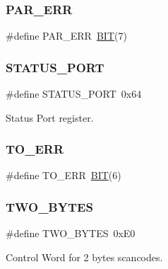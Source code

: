 \subsubsection{\texorpdfstring{P\+A\+R\+\_\+\+E\+RR}{PAR\_ERR}}
{\footnotesize\ttfamily \#define P\+A\+R\+\_\+\+E\+RR~\hyperlink{tools_8h_a3a8ea58898cb58fc96013383d39f482c}{B\+IT}(7)}

\hypertarget{group__i8042_ga923231d2e45aaea2dbab3532b06c2311}{}\label{group__i8042_ga923231d2e45aaea2dbab3532b06c2311} 
\subsubsection{\texorpdfstring{S\+T\+A\+T\+U\+S\+\_\+\+P\+O\+RT}{STATUS\_PORT}}
{\footnotesize\ttfamily \#define S\+T\+A\+T\+U\+S\+\_\+\+P\+O\+RT~0x64}



Status Port register. 

\hypertarget{group__i8042_gad16f61e2bf70f6c7685e826224ed177f}{}\label{group__i8042_gad16f61e2bf70f6c7685e826224ed177f} 
\subsubsection{\texorpdfstring{T\+O\+\_\+\+E\+RR}{TO\_ERR}}
{\footnotesize\ttfamily \#define T\+O\+\_\+\+E\+RR~\hyperlink{tools_8h_a3a8ea58898cb58fc96013383d39f482c}{B\+IT}(6)}

\hypertarget{group__i8042_gab427e6926fcc47eb1c02c1f78162b6f6}{}\label{group__i8042_gab427e6926fcc47eb1c02c1f78162b6f6} 
\subsubsection{\texorpdfstring{T\+W\+O\+\_\+\+B\+Y\+T\+ES}{TWO\_BYTES}}
{\footnotesize\ttfamily \#define T\+W\+O\+\_\+\+B\+Y\+T\+ES~0x\+E0}



Control Word for 2 bytes scancodes. 

